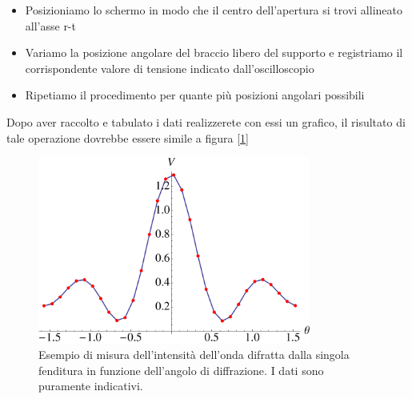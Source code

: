 \documentclass[a4paper,10pt,oneside]{article}
\begin{document}
\begin{itemize}
 \item Posizioniamo lo schermo in modo che il centro dell'apertura si trovi allineato all'asse r-t
 \item Variamo la posizione angolare del braccio libero del supporto e registriamo il corrispondente valore di tensione indicato dall'oscilloscopio
 \item Ripetiamo il procedimento per quante più posizioni angolari possibili
\end{itemize}
Dopo aver raccolto e tabulato i dati realizzerete con essi un grafico, il risultato di tale operazione dovrebbe essere simile a figura [\ref{fig:fraun_misura}]

\begin{figure}[H]
 \centering
 \includegraphics[width=0.8\textwidth]{../Immagini/esempio_misura_fraun.pdf}
 \caption{Esempio di misura dell'intensità dell'onda difratta dalla singola fenditura in funzione dell'angolo di diffrazione. I dati sono puramente indicativi.}
 \label{fig:fraun_misura}
\end{figure}
\end{document}
